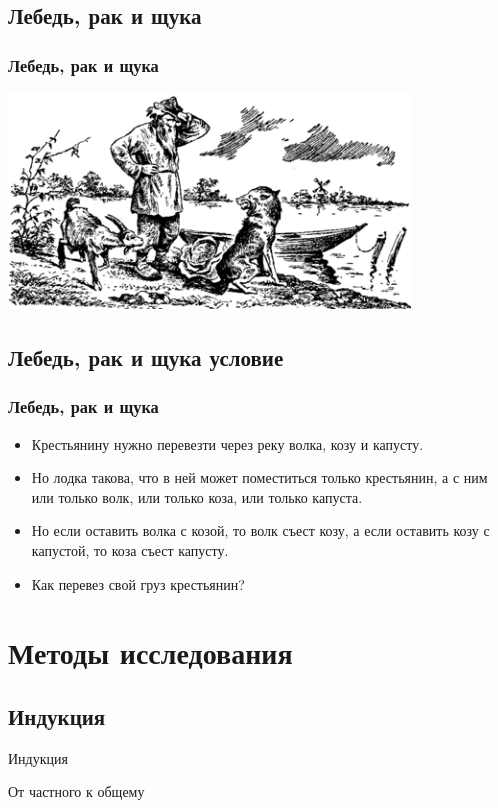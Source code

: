 \documentclass[compress,red]{beamer}
\begin{document}
\subsection{Лебедь, рак и щука}
\begin{frame}[fragile]
  \frametitle{Лебедь, рак и щука}
  \centerline{\includegraphics[width=0.8\textwidth]{images/omg.png}}
\end{frame}

\subsection{Лебедь, рак и щука условие}
\begin{frame}[fragile]
  \frametitle{Лебедь, рак и щука}
  \begin{itemize}
    \item Крестьянину нужно перевезти через реку волка, козу и капусту. 
    \item Но лодка такова, что в ней может поместиться только крестьянин, а с ним или только волк, или только коза, или только капуста.
    \item Но если оставить волка с козой, то волк съест козу, а если оставить козу с капустой, то коза съест капусту.
    \item Как перевез свой груз крестьянин?
  \end{itemize}
\end{frame}

\section{Методы исследования}
\subsection{Индукция}
\begin{frame}
  \begin{center}
    \Huge{Индукция}
  \end{center}
  \begin{center}
    \Large{От частного к общему}
  \end{center}
\end{frame}
\end{document}
